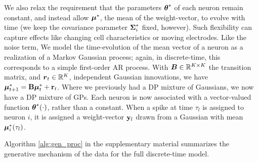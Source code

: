 We also relax the requirement that the parameters $\boldsymbol{\theta}^*$ of each neuron remain constant, and instead allow $\boldsymbol{\mu}^*$, the mean of the weight-vector,
to evolve with time (we keep the covariance parameter $\boldsymbol{\Sigma}^*_i$ fixed, however). Such flexibility can capture effects like changing cell 
characteristics or moving electrodes.
Like the noise term, We model the time-evolution of the mean vector of a neuron as a realization of a Markov Gaussian process; again, in 
discrete-time, this corresponds to a simple first-order 
AR process. With $\boldsymbol{B} \in \mathbb{R}^{K \times K}$ the transition matrix, and $\boldsymbol{r}_t \in \mathbb{R}^K$, 
independent Gaussian {innovations}, we have
% 
  $\boldsymbol{\mu}^*_{t+1} = \mathbf{B} \boldsymbol{\mu}^*_t + \mathbf{r}_t$.
Where we previously had a DP mixture of Gaussians, we now have a DP mixture of GPs. Each neuron is now associated with a vector-valued function 
$\boldsymbol{\theta}^*(\cdot)$, rather than a constant. When a spike at time $\tau_l$ is assigned to neuron $i$, it is assigned a weight-vector $\mathbf{y}_l$ drawn from a 
Gaussian with mean $\boldsymbol{\mu}^*_i(\tau_l)$. %

Algorithm \ref{alg:gen_proc} in the supplementary material summarizes the generative mechanism of the data for the full discrete-time model.
